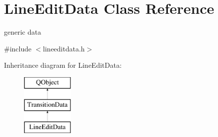 \hypertarget{class_line_edit_data}{}\section{Line\+Edit\+Data Class Reference}
\label{class_line_edit_data}


generic data  




{\ttfamily \#include $<$lineeditdata.\+h$>$}

Inheritance diagram for Line\+Edit\+Data\+:\begin{figure}[H]
\begin{center}
\leavevmode
\includegraphics[height=3.000000cm]{class_line_edit_data}
\end{center}
\end{figure}
